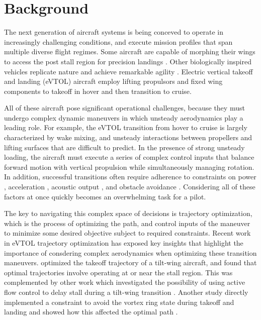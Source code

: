 \documentclass[12pt, letterpaper]{article}
\begin{document}
\section{Background}


The next generation of aircraft systems is being conceved to operate in increasingly challenging conditions, and execute mission profiles that span multiple diverse flight regimes.  Some aircraft are capable of morphing their wings to access the post stall region for precision landings \cite{bakhshi2025coupled}.  Other biologically inspired vehicles replicate nature and achieve remarkable agility \cite{lee2022transition, tian2020cfd}.  Electric vertical takeoff and landing (eVTOL) aircraft employ lifting propulsors and fixed wing components to takeoff in hover and then transition to cruise.  

All of these aircraft pose significant operational challenges, because they must undergo complex dynamic maneuvers in which unsteady aerodynamics play a leading role.  For example, the eVTOL transition from hover to cruise is largely characterized by wake mixing, and unsteady interactions between propellers and lifting surfaces that are difficult to predict.  In the presence of strong unsteady loading, the aircraft must execute a series of complex control inputs that balance forward motion with vertical propulsion while simultaneously managing rotation. In addition, successful transitions often require adherence to constraints on power \cite{moradi2024urban}, acceleration \cite{xiang2024autonomous}, acoustic output \cite{raza2025noise}, and obstacle avoidance \cite{shukla2025trajectory}. Considering all of these factors at once quickly becomes an overwhelming task for a pilot.

The key to navigating this complex space of decisions is trajectory optimization, which is the process of optimizing the path, and control inputs of the maneuver to minimize some desired objective subject to required constraints.  Recent work in eVTOL trajectory optimization has exposed key insights that highlight the importance of consdering complex aerodynamics when optimizing these transition maneuvers.  \cite{chauhan2020tilt} optimized the takeoff trajectory of a tilt-wing aircraft, and found that optimal trajectories involve operating at or near the stall region.  This was complemented by other work which investigated the possibility of using active flow control to delay stall during a tilt-wing transition \cite{panish2025tiltwing}. Another study directly implemented a constraint to avoid the vortex ring state during takeoff and landing and showed how this affected the optimal path \cite{park2023trajectory}.
\end{document}
